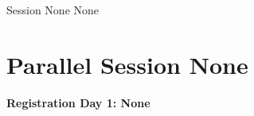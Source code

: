 \clearpage
{}
\begin{ThreeSessionOverview}{Session None}{\daydateyear}
  {None}
\end{ThreeSessionOverview}

\newpage
\section*{Parallel Session None}
{\bfseries\large Registration Day 1: None}\\
\TrackALoc\hfill\sessionchair{}{}
\clearpage



